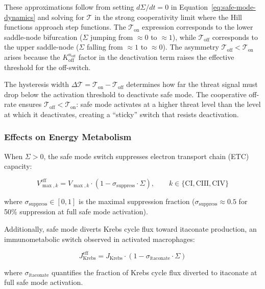 These approximations follow from setting $d\Sigma/dt = 0$ in Equation~\ref{eq:safe-mode-dynamics} and solving for $\mathcal{T}$ in the strong cooperativity limit where the Hill functions approach step functions. The $\mathcal{T}_{\text{on}}$ expression corresponds to the lower saddle-node bifurcation ($\Sigma$ jumping from $\approx 0$ to $\approx 1$), while $\mathcal{T}_{\text{off}}$ corresponds to the upper saddle-node ($\Sigma$ falling from $\approx 1$ to $\approx 0$). The asymmetry $\mathcal{T}_{\text{off}} < \mathcal{T}_{\text{on}}$ arises because the $K_{\text{off}}^{n_{\text{off}}}$ factor in the deactivation term raises the effective threshold for the off-switch.

The hysteresis width $\Delta\mathcal{T} = \mathcal{T}_{\text{on}} - \mathcal{T}_{\text{off}}$ determines how far the threat signal must drop below the activation threshold to deactivate safe mode. The cooperative off-rate ensures $\mathcal{T}_{\text{off}} < \mathcal{T}_{\text{on}}$: safe mode activates at a higher threat level than the level at which it deactivates, creating a ``sticky'' switch that resists deactivation.

\subsubsection{Effects on Energy Metabolism}

When $\Sigma > 0$, the safe mode switch suppresses electron transport chain (ETC) capacity:

\begin{equation}
\label{eq:safe-mode-etc}
V_{\max,k}^{\text{eff}} = V_{\max,k} \cdot (1 - \sigma_{\text{suppress}} \cdot \Sigma), \qquad k \in \{\text{CI}, \text{CIII}, \text{CIV}\}
\end{equation}

where $\sigma_{\text{suppress}} \in [0, 1]$ is the maximal suppression fraction ($\sigma_{\text{suppress}} \approx 0.5$ for 50\% suppression at full safe mode activation).

Additionally, safe mode diverts Krebs cycle flux toward itaconate production, an immunometabolic switch observed in activated macrophages:

\begin{equation}
\label{eq:safe-mode-itaconate}
J_{\text{Krebs}}^{\text{eff}} = J_{\text{Krebs}} \cdot (1 - \sigma_{\text{itaconate}} \cdot \Sigma)
\end{equation}

where $\sigma_{\text{itaconate}}$ quantifies the fraction of Krebs cycle flux diverted to itaconate at full safe mode activation.

